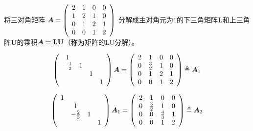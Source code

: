 \begin{li}
  将三对角矩阵
  $
  \boldsymbol{A} = \left(
    \begin{array}{cccc}
      2 & 1 & 0 & 0\\
      1 & 2 & 1 & 0\\
      0 & 1 & 2 & 1\\
      0 & 0 & 1 & 2
    \end{array}
  \right)
  $
  分解成主对角元为$1$的下三角矩阵$\mathbf{L}$和上三角阵$\mathbf{U}$的乘积$\boldsymbol{A}=\mathbf{L}\mathbf{U}$（称为矩阵的LU分解）。
\end{li}
\begin{jie}
  $$
  \left(
    \begin{array}{cccc}
      1 & && \\
      -\frac12 &1&&\\
        &&1&\\
        &&&1
    \end{array}
  \right)\boldsymbol{A} = \left(
    \begin{array}{cccc}
      2 & 1 & 0 & 0\\
      0 & \frac32 & 1 & 0\\
      0 & 1 & 2 & 1\\
      0 & 0 & 1 & 2
    \end{array}
  \right) \triangleq \boldsymbol{A}_1
  $$

  $$
  \left(
    \begin{array}{cccc}
      1 & && \\
        &1&&\\
        &-\frac23&1&\\
        &&&1
    \end{array}
  \right)\boldsymbol{A}_1 = \left(
    \begin{array}{cccc}
      2 & 1 & 0 & 0\\
      0 & \frac32 & 1 & 0\\
      0 & 0 & \frac43 & 1\\
      0 & 0 & 1 & 2
    \end{array}
  \right) \triangleq \boldsymbol{A}_2
  $$



\end{jie}
